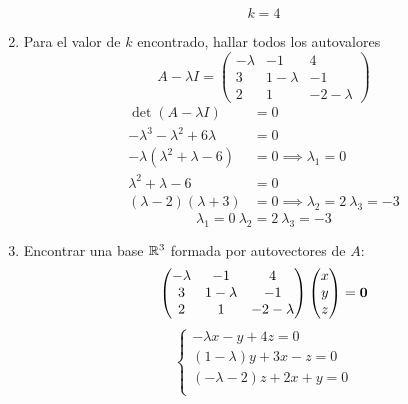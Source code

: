 \documentclass[../practica.root.tex]{subfiles}
\begin{document}
\begin{enumerate}
          \[ \boxed{ k = 4 } \]
    \item Para el valor de $ k $ encontrado, hallar todos los autovalores
          \[
              A - \lambda I=
              \begin{pmatrix}
                  -\lambda & -1        & 4          \\
                  3        & 1-\lambda & -1         \\
                  2        & 1         & -2-\lambda
              \end{pmatrix}
          \]
          \begin{align*}
              \det(A - \lambda I)              & = 0                                          \\
              -\lambda^3 -\lambda^2 + 6\lambda & = 0                                          \\
              -\lambda(\lambda^2 + \lambda -6) & = 0 \implies \lambda_1 = 0                   \\
              \lambda^2 + \lambda -6           & = 0                                          \\
              (\lambda - 2)(\lambda + 3)       & = 0 \implies \lambda_2 = 2 \  \lambda_3 = -3
          \end{align*}
          \[ \boxed{\lambda_1 = 0 \ \lambda_2 = 2 \ \lambda_3 = -3} \]
    \item Encontrar una base $ \mathbb{R}^3 $ formada por autovectores de $ A $:
          \[
              \begin{pmatrix}
                  -\lambda & -1        & 4          \\
                  3        & 1-\lambda & -1         \\
                  2        & 1         & -2-\lambda
              \end{pmatrix}
              \begin{pmatrix}
                  x \\ y \\ z
              \end{pmatrix}
              =
              \mathbf{0}
          \] \[
              \begin{cases}
                  -\lambda x - y + 4z = 0       \\
                  (1 - \lambda) y + 3x - z = 0  \\
                  (-\lambda - 2) z + 2x + y = 0 \\
              \end{cases}
\]
\end{enumerate}
\end{document}
